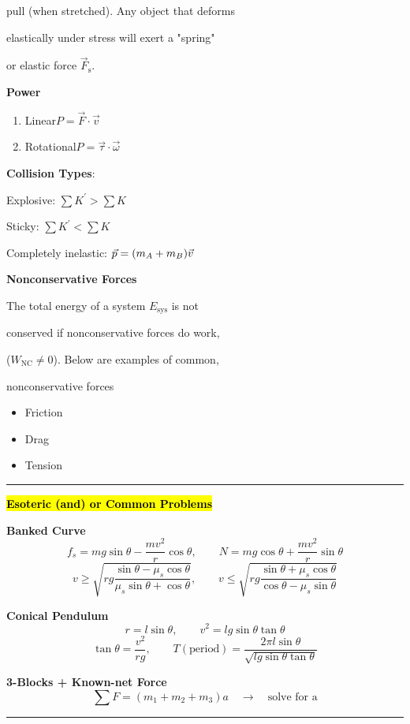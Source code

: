 \documentclass[	DIV=calc,%
							paper=a4,%
							fontsize=11pt,%
							twocolumn]{scrartcl} %
\newcommand{\hformbar}[1]{\vspace{5pt}\hrule\vspace{10pt}} %
\newcommand{\pvec}[1]{\vec{#1}\mkern2mu\vphantom{#1}}
\newcommand{\formdesc}[1]{\noindent\textbf{#1}}
\begin{document}
pull (when stretched). Any object that deforms 

elastically under stress will exert a "spring" 

or elastic force $\vec F_\text{s}$. 

\textbf{Power}
\begin{enumerate}
    \item Linear\qquad\qquad$P=\vec F\cdot\vec v$
    \item Rotational\qquad$P=\vec\tau\cdot\vec\omega$
\end{enumerate}

\textbf{Collision Types}:

\qquad Explosive: $\sum K^\prime > \sum K$

\qquad Sticky: $\sum K^\prime < \sum K$

\qquad Completely inelastic: $\vec p = (m_A+m_B)\pvec{v}$

\textbf{Nonconservative Forces}

The total energy of a system $E_\text{sys}$ is not 

conserved if nonconservative forces do work, 

($W_{\text{NC}}\ne 0$). Below are examples of common, 

nonconservative forces
\begin{itemize}
    \item Friction
    \item Drag
    \item Tension
\end{itemize}
\hformbar{}

\formdesc{\hl{Esoteric (and) or Common Problems}}

\textbf{Banked Curve}
$$f_s=mg\sin\theta-\frac{mv^2}{r}\cos\theta,\qquad N=mg\cos\theta+\frac{mv^2}{r}\sin\theta$$
$$v\ge\sqrt{rg\frac{\sin\theta-\mu_s\cos\theta}{\mu_s\sin\theta+\cos\theta}},\qquad v\le\sqrt{rg\frac{\sin\theta+\mu_s\cos\theta}{\cos\theta-\mu_s\sin\theta}}$$

\textbf{Conical Pendulum}
$$r=l\sin\theta,\qquad v^2=lg\sin\theta\tan\theta$$
$$\tan\theta=\frac{v^2}{rg},\qquad T(\text{period})=\frac{2\pi l\sin\theta}{\sqrt{lg\sin\theta\tan\theta}}$$

\textbf{3-Blocks + Known-net Force}
$$\sum F=(m_1+m_2+m_3)a\quad\rightarrow\quad\text{solve for a}$$
\hformbar{}

\textbf{}
\end{document}
